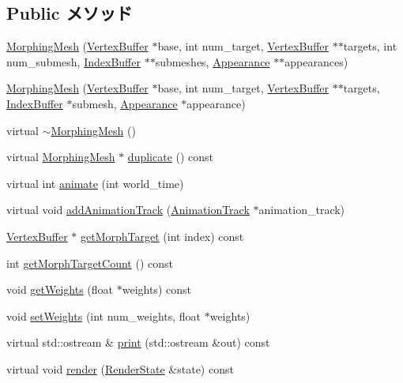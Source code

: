 \subsection*{Public メソッド}
\begin{CompactItemize}
\item 
\hyperlink{classm3g_1_1MorphingMesh_211192cdba0b1d136977403ba4ed0d0c}{MorphingMesh} (\hyperlink{classm3g_1_1VertexBuffer}{VertexBuffer} $\ast$base, int num\_\-target, \hyperlink{classm3g_1_1VertexBuffer}{VertexBuffer} $\ast$$\ast$targets, int num\_\-submesh, \hyperlink{classm3g_1_1IndexBuffer}{IndexBuffer} $\ast$$\ast$submeshes, \hyperlink{classm3g_1_1Appearance}{Appearance} $\ast$$\ast$appearances)
\item 
\hyperlink{classm3g_1_1MorphingMesh_4a2347ee9c813fa1a6eef998f37bf6d5}{MorphingMesh} (\hyperlink{classm3g_1_1VertexBuffer}{VertexBuffer} $\ast$base, int num\_\-target, \hyperlink{classm3g_1_1VertexBuffer}{VertexBuffer} $\ast$$\ast$targets, \hyperlink{classm3g_1_1IndexBuffer}{IndexBuffer} $\ast$submesh, \hyperlink{classm3g_1_1Appearance}{Appearance} $\ast$appearance)
\item 
virtual \hyperlink{classm3g_1_1MorphingMesh_cdafafba64a0167f28f3b66ac4b9d7d6}{$\sim$MorphingMesh} ()
\item 
virtual \hyperlink{classm3g_1_1MorphingMesh}{MorphingMesh} $\ast$ \hyperlink{classm3g_1_1MorphingMesh_7e7b2c3c4c988c6341a5e249bd468f57}{duplicate} () const 
\item 
virtual int \hyperlink{classm3g_1_1MorphingMesh_8aad1ceab4c2a03609c8a42324ce484d}{animate} (int world\_\-time)
\item 
virtual void \hyperlink{classm3g_1_1MorphingMesh_415c0b110f95410ded9b85e5d99a496b}{addAnimationTrack} (\hyperlink{classm3g_1_1AnimationTrack}{AnimationTrack} $\ast$animation\_\-track)
\item 
\hyperlink{classm3g_1_1VertexBuffer}{VertexBuffer} $\ast$ \hyperlink{classm3g_1_1MorphingMesh_44766cc08b595f074d0d698c75f544b4}{getMorphTarget} (int index) const 
\item 
int \hyperlink{classm3g_1_1MorphingMesh_620d9684124201f738a28c7c39641541}{getMorphTargetCount} () const 
\item 
void \hyperlink{classm3g_1_1MorphingMesh_80cef3b2c5e4881567409829de224e46}{getWeights} (float $\ast$weights) const 
\item 
void \hyperlink{classm3g_1_1MorphingMesh_b97015e8aeed76a33582eb11d06e322b}{setWeights} (int num\_\-weights, float $\ast$weights)
\item 
virtual std::ostream \& \hyperlink{classm3g_1_1MorphingMesh_6fea17fa1532df3794f8cb39cb4f911f}{print} (std::ostream \&out) const 
\item 
virtual void \hyperlink{classm3g_1_1MorphingMesh_8babc8a79b78615da51161e94029eea9}{render} (\hyperlink{structm3g_1_1RenderState}{RenderState} \&state) const 
\end{CompactItemize}
